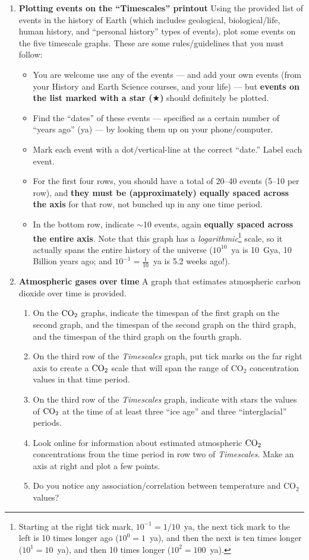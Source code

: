 \documentclass[12pt]{article}
\begin{document}
\begin{enumerate}
\item {\bf Plotting events on the ``Timescales'' printout} Using the provided list of events in the history of Earth (which includes geological, biological/life, human history, and ``personal history'' types of events), plot some events on the five timescale graphs. These are some rules/guidelines that you must follow:
	\begin{itemize} 
	\item You are welcome use any of the events --- and add your own events (from your History and Earth Science courses, and your life) --- but {\bf events on the list marked with a star ($\bigstar$)} should definitely be plotted.
	\item Find the ``dates'' of these events --- specified as a certain number of ``years ago'' (ya) ---  by looking them up on your phone/computer.
	\item Mark each event with a dot/vertical-line at the correct ``date.'' Label each event.
	\item For the first four rows, you should have a total of 20--40 events (5--10 per row), and {\bf they must be (approximately) equally spaced across the axis} for that row, not bunched up in any one time period.
	\item In the bottom row, indicate $\sim$10 events, again {\bf equally spaced across the entire axis}. Note that this graph has a {\em logarithmic}\footnote{Starting at the right tick mark, $10^{-1} = 1/10$~ya, the next tick mark to the left is 10 times longer ago ($10^0 = 1$~ya), and then the next is ten times longer ($10^1 = 10$~ya), and then 10 times longer ($10^2 = 100$~ya). } scale, so it actually spans the entire history of the universe ($10^{10}$~ya is 10~Gya, 10 Billion years ago; and $10^{-1} = \frac{1}{10}$~ya is 5.2 weeks ago!).  
	\end{itemize}

\item {\bf Atmospheric gases over time} A graph that estimates atmospheric carbon dioxide over time is provided.  
	\begin{enumerate}
	\item On the ${\rm CO}_2$ graphs, indicate the timespan of the first graph on the second graph, and the timespan of the second graph on the third graph, and the timespan of the third graph on the fourth graph.
	\item On the third row of the {\em Timescales} graph, put tick marks on the far right axis to create a ${\rm CO}_2$ scale that will span the range of $\text{CO}_2$ concentration values in that time period.
	\item On the third row of the {\em Timescales} graph, indicate with stars the values of ${\rm CO}_2$ at the time of at least three ``ice age'' and three ``interglacial'' periods.
	\item Look online for information about estimated atmospheric ${\rm CO}_2$ concentrations from the time period in row two of {\em Timescales}.  Make an axis at right and plot a few points.
	\item Do you notice any association/correlation between temperature and $\text{CO}_2$ values?
	\end{enumerate}


\end{enumerate}
\end{document}
